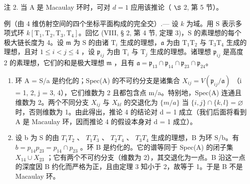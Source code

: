 注 2. 当 A 是 Macaulay 环时，可对 \(d=1\) 应用该推论（ \(\S\) 2, 第 5 节）。

例（由 4 维仿射空间的四个坐标平面构成的完全交）.--- 设 \(k\) 为域。用 S 表示多项式环 \(k[\mathrm{T}_{1},\mathrm{T}_{2},\mathrm{T}_{3},\mathrm{T}_{4}]\)。回忆 (VIII, § 2, 第 4 节, 定理 3)，S 的素理想的每个极大链长度为 4。设 \(\mathfrak{m}\) 为 S 的由诸 \(\mathrm{T}_{i}\) 生成的理想，\(\mathfrak{a}\) 为由 \(\mathrm{T}_{1}\mathrm{T}_{2}\) 与 \(\mathrm{T}_{3}\mathrm{T}_{4}\) 生成的理想，且对 \(1 \leqslant i < j \leqslant 4\) ，设 \(\mathfrak{p}_{ij}\) 为由 \(\mathrm{T}_{i}\) 与 \(\mathrm{T}_{j}\) 生成的理想。诸理想 \(\mathfrak{p}_{ij}\) 是高度 2 的素理想，它们的和是极大理想 \(\mathfrak{m}\) ，且有 \(\mathfrak{a} = \mathfrak{p}_{13} \cap \mathfrak{p}_{14} \cap \mathfrak{p}_{23} \cap \mathfrak{p}_{24}\)。

\begin{enumerate}
\def\labelenumi{\alph{enumi})}
\item
  环 A = S/a 是约化的；Spec(A) 的不可约分支是诸集合 \(X_{ij} = V(\mathfrak{p}_{ij}/\mathfrak{a})\) （i = 1, 2, j = 3, 4），它们维数为 2 且都包含点 m/a。特别地，Spec(A) 连通且维数为 2。两个不同分支 \(X_{ij}\) 与 \(X_{kl}\) 的交退化为 \(\{m/a\}\) 当 \(\{i,j\} \cap \{k,l\} = \varnothing\) 时，否则维数为 1。由此得出，推论 4 的结论对 d = 1 成立（我们后面将看到 A 是 Macaulay 环，因而推论 4 的假设本身对 d = 1 成立）。
\item
  设 b 为 S 的由 \(T_{1}T_{2}\) 、 \(T_{1}T_{3}\) 、 \(T_{2}T_{4}\) 、 \(T_{3}T_{4}\) 生成的理想，B 为环 S/b。有 \(b = p_{14}p_{23} = p_{14} \cap p_{23}\) 。环 B 是约化的。它的谱等同于 Spec(A) 的闭子集 \(X_{14} \cup X_{23}\) ；它有两个不可约分支（维数为 2），其交退化为一点。B 沿这一点的深度因 B 约化而严格为正，且由定理 3 知小于 2，故等于 1。于是 B 不是 Macaulay 环。
\end{enumerate}

